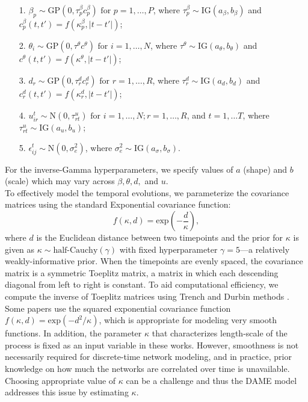 \documentclass[a4paper]{article}
\begin{document}
\begin{center}
\begin{itemize}
	\item[1.] $\beta_{p}\sim \mbox{GP}(0, \tau^{\beta}_pc^\beta_{p})\mbox{ for }p = 1,\ldots,P$, where $\tau^{\beta}_p \sim \mbox{IG}(a_\beta, b_\beta)$ and $c^\beta_p(t, t')=f(\kappa^\beta_{p}, |t-t'|)$;
	\item[2.] $\theta_{i}\sim \mbox{GP}(0, \tau^{\theta}c^\theta)\mbox{ for }i = 1,\ldots,N$, where $\tau^{\theta}\sim \mbox{IG}(a_\theta, b_\theta)$ and $c^\theta(t, t')=f(\kappa^\theta, |t-t'|)$;
	\item[3.] $d_{r}\sim \mbox{GP}(0, \tau^{d}_r c^d_r)\mbox{ for }r = 1,\ldots,R$, where $\tau_r^{d} \sim \mbox{IG}(a_d, b_d)$ and  $c^d_r(t, t')=f(\kappa^d_{r}, |t-t'|)$;
	\item[4.] $u^t_{ir}\sim\mbox{N}(0, {\tau}^u_{rt})\mbox{ for }i = 1,\ldots,N; r=1,\ldots,R$, and $t=1,\ldots T$, where ${\tau}^u_{rt}\sim \mbox{IG}(a_u, b_u)$;
	\item[5.] $\epsilon^t_{ij} \sim \mbox{N}(0, \sigma_e^2)$, where $\sigma_e^2 \sim \mbox{IG}(a_\sigma, b_\sigma)$. 
\end{itemize}
\end{center}
 For the inverse-Gamma hyperparameters, we specify values of $a$ (shape) and $b$ (scale) which may vary across $\beta, \theta, d,$ and  $u$. %
\\ \newline
To effectively model the temporal evolutions, we parameterize the covariance matrices using the standard Exponential covariance function:
\begin{equation*}
f(\kappa, d) = \mbox{exp}\left(-\frac{d}{\kappa}\right),
\end{equation*}
where $d$ is the Euclidean distance between two timepoints and the prior for $\kappa$ is given as $\kappa \sim \mbox{half-Cauchy}(\gamma)$ with fixed hyperparameter $\gamma=5$---a relatively weakly-informative prior. When the timepoints are evenly spaced, the covariance matrix is a symmetric Toeplitz matrix, a matrix in which each descending diagonal from left to right is constant. To aid computational efficiency, we compute the inverse of Toeplitz matrices using Trench and Durbin methods \citep{golub2012matrix}. \\ \newline
Some papers \citep{bhattacharya2011sparse,durante2013nonparametric,durante2014bayesian} use the squared exponential covariance function $f(\kappa, d) = \mbox{exp}(-d^2/{\kappa})$, which is appropriate for modeling very smooth functions. In addition, the parameter $\kappa$ that characterizes length-scale of the process is fixed as an input variable in these works. However, smoothness is not necessarily required for discrete-time network modeling, and in practice, prior knowledge on how much the networks are correlated over time is unavailable. Choosing appropriate value of $\kappa$ can be a challenge and thus the DAME model addresses this issue by estimating $\kappa$. 
\end{document}
